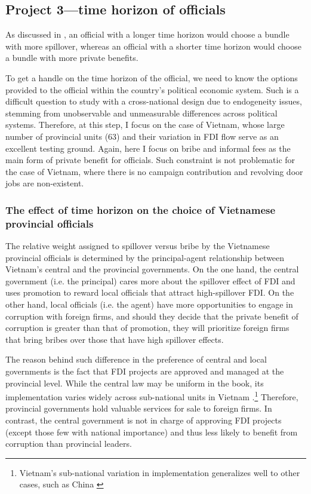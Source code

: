\subsection{Project 3---time horizon of officials}

As discussed in , an official with a longer time horizon would choose a bundle with more spillover, whereas an official with a shorter time horizon would choose a bundle with more private benefits.

To get a handle on the time horizon of the official, we need to know the options provided to the official within the country's political economic system. Such is a difficult question to study with a cross-national design due to endogeneity issues, stemming from unobservable and unmeasurable differences across political systems. Therefore, at this step, I focus on the case of Vietnam, whose large number of provincial units (63) and their variation in FDI flow serve as an excellent testing ground. Again, here I focus on bribe and informal fees as the main form of private benefit for officials. Such constraint is not problematic for the case of Vietnam, where there is no campaign contribution and revolving door jobs are non-existent.

\subsubsection{The effect of time horizon on the choice of Vietnamese provincial officials} 

The relative weight assigned to spillover versus bribe by the Vietnamese provincial officials is determined by the principal-agent relationship between Vietnam's central and the provincial governments. On the one hand, the central government (i.e. the principal) cares more about the spillover effect of FDI and uses promotion to reward local officials that attract high-spillover FDI. On the other hand, local officials (i.e. the agent) have more opportunities to engage in corruption with foreign firms, and should they decide that the private benefit of corruption is greater than that of promotion, they will prioritize foreign firms that bring bribes over those that have high spillover effects.

The reason behind such difference in the preference of central and local governments is the fact that FDI projects are approved and managed at the provincial level. While the central law may be uniform in the book, its implementation varies widely across sub-national units in Vietnam \citep{Meyer2005}.\footnote{Vietnam's sub-national variation in implementation generalizes well to other cases, such as China \citep{Thun2006}} Therefore, provincial governments hold valuable services for sale to foreign firms. In contrast, the central government is not in charge of approving FDI projects (except those few with national importance) and thus less likely to benefit from corruption than provincial leaders.

